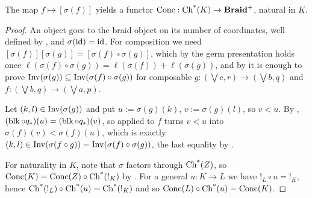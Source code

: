 \documentclass[11pt]{article}
\begin{document}
\begin{theorem}\label{thm:conc}
The map $f \mapsto [\sigma(f)]$ yields a functor $\operatorname{Conc} : \operatorname{Ch^*}(K) \to \mathbf{Braid}^{+}$, natural in $K$.
\end{theorem}
\begin{proof}
An object goes to the braid object on its number of coordinates, well defined by
, and $\sigma(\operatorname{id}) = \operatorname{id}$. For
composition we need $[\sigma(f)][\sigma(g)] = [\sigma(f) \circ \sigma(g)]$, which by the germ
presentation holds once $\ell(\sigma(f) \circ \sigma(g)) = \ell(\sigma(f)) + \ell(\sigma(g))$, and by
 it is enough to prove
$\operatorname{Inv}(\sigma(g)) \subseteq \operatorname{Inv}(\sigma(f) \circ \sigma(g))$
for composable $g : (\bigvee c, r) \to (\bigvee b, q)$ and $f : (\bigvee b, q) \to (\bigvee a, p)$.

Let $(k,l) \in \operatorname{Inv}(\sigma(g))$ and put $u := \sigma(g)(k)$, $v := \sigma(g)(l)$, so $v < u$. By
, $(\operatorname{blk} \circ q_*)(u) = (\operatorname{blk} \circ q_*)(v)$, so
 applied to $f$ turns $v < u$ into $\sigma(f)(v) < \sigma(f)(u)$, which is
exactly $(k,l) \in \operatorname{Inv}(\sigma(f \circ g)) = \operatorname{Inv}(\sigma(f) \circ \sigma(g))$, the last equality by
.

For naturality in $K$, note that $\sigma$ factors through $\operatorname{Ch^*}(Z)$, so
$\operatorname{Conc}(K) = \operatorname{Conc}(Z) \circ \operatorname{Ch^*}(!_K)$ by . For a general $u : K \to L$ we have
$!_L \circ u = !_K$, hence $\operatorname{Ch^*}(!_L) \circ \operatorname{Ch^*}(u) = \operatorname{Ch^*}(!_K)$ and so
$\operatorname{Conc}(L) \circ \operatorname{Ch^*}(u) = \operatorname{Conc}(K)$.
\end{proof}
\end{document}
